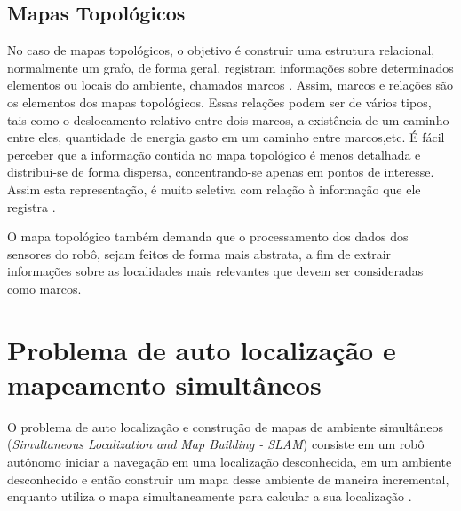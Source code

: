 \subsection{Mapas Topológicos}
No caso de mapas topológicos, o objetivo é construir uma estrutura relacional, normalmente um grafo, 
de forma geral, registram informações sobre determinados
elementos ou locais do ambiente, chamados marcos \cite{construcaoMapas2}. 
Assim, marcos e relações são os elementos dos mapas topológicos.
Essas relações podem ser de vários tipos, tais como o deslocamento
relativo entre dois marcos, a existência de um caminho entre eles,
quantidade de energia gasto em um caminho entre marcos,etc. 
É fácil perceber que a informação contida no mapa topológico é
menos detalhada e distribui-se de forma dispersa, concentrando-se apenas em pontos de interesse.
Assim esta representação, é muito seletiva com relação à informação que ele registra \cite{construcaoMapas2}. 

O mapa topológico também demanda que o processamento
dos dados dos sensores do robô, sejam feitos de forma mais abstrata, 
a fim de extrair informações sobre as localidades mais relevantes que devem ser consideradas
como marcos.

\section{Problema de auto localização e mapeamento simultâneos}
  O problema de auto localização e construção de mapas de ambiente simultâneos (\textit{Simultaneous Localization and
Map Building - SLAM}) consiste em um robô autônomo iniciar a navegação
em uma localização desconhecida, em um ambiente desconhecido e então construir um mapa
desse ambiente de maneira incremental, enquanto utiliza o mapa simultaneamente para calcular a sua localização \cite{slam}.
 
